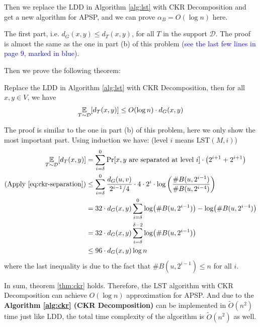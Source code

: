 \begin{answer}
\begin{enumerate}[label=\alph*).]
        Then we replace the LDD in Algorithm \ref{alg:lst} with CKR Decomposition and get a new algorithm for APSP, and we can prove $\alpha_B = O(\log n)$ here.

        The first part, i.e. $d_G(x, y) \le d_T(x, y)$, for all $T$ in the support $\mathcal{D}$. The proof is almost the same as the one in part (b) of this problem \textcolor{blue}{(see the last few lines in page 9, marked in blue)}.

        Then we prove the following theorem: 
        \begin{theorem}
            \label{thm:ckr}
            Replace the LDD in Algorithm \ref{alg:lst} with CKR Decomposition, then for all $x, y \in V$, we have
            \begin{align*}
                \operatorname*{\mathbb{E}}_{T\sim \mathcal{D}}[d_T(x, y)] \le O(\log n) \cdot d_G(x,y)
            \end{align*}
        \end{theorem}       
        The proof is similar to the one in part (b) of this problem, here we only show the most important part. 
        Using induction we have: (level $i$ means LST$(M, i)$)
        \begin{align*}
            \operatorname*{\mathbb{E}}_{T\sim \mathcal{D}}[d_T(x, y)] &= \sum_{i=\delta}^{0} \Pr[x, y\text{ are separated at level } i] \cdot \left(2^{i+1} + 2^{i+1}\right) \\
            (\text{Apply \eqref{eq:ckr-separation}}) &\le  \sum_{i=\delta}^{0} \frac{d_G(u,v)}{2^{i-1}/4} \cdot 4\cdot 2^i \cdot \log\left(\frac{\# B(u, 2^{i-1})}{\# B(u, 2^{i-4})}\right) \\
            &= 32 \cdot d_G(x,y) \sum_{i=\delta}^{0} \log (\# B(u, 2^{i-1})) - \log (\# B(u, 2^{i-4})) \\
            &= 32 \cdot d_G(x,y) \sum_{i=\delta}^{\delta-2} \log (\# B(u, 2^{i-1})) \\
            &\le 96 \cdot d_G(x,y) \log n
        \end{align*}    
        where the last inequality is due to the fact that $\# B(u, 2^{i-1}) \le n$ for all $i$.

        In sum, theorem \ref{thm:ckr} holds. Therefore, the LST algorithm with CKR Decomposition can achieve $O(\log n)$ approximation for APSP. 
        And due to the \textbf{Algorithm \ref{alg:ckr} (CKR Decomposition)} can be implemented in $\tilde{O}(n^2)$ time just like LDD, the total time complexity of the algorithm is $\tilde{O}(n^2)$ as well.
    \end{enumerate}
    \ed
\end{answer}